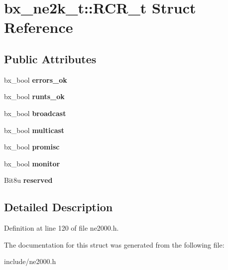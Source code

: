 \hypertarget{structbx__ne2k__t_1_1RCR__t}{\section{bx\-\_\-ne2k\-\_\-t\-:\-:R\-C\-R\-\_\-t Struct Reference}
\label{structbx__ne2k__t_1_1RCR__t}
}
\subsection*{Public Attributes}
\begin{DoxyCompactItemize}
\item 
\hypertarget{structbx__ne2k__t_1_1RCR__t_ae68499bda74dc5304345d81e47138eb1}{bx\-\_\-bool {\bfseries errors\-\_\-ok}}\label{structbx__ne2k__t_1_1RCR__t_ae68499bda74dc5304345d81e47138eb1}

\item 
\hypertarget{structbx__ne2k__t_1_1RCR__t_aa1c91619f3ddc9999a23e1f09dfd2d14}{bx\-\_\-bool {\bfseries runts\-\_\-ok}}\label{structbx__ne2k__t_1_1RCR__t_aa1c91619f3ddc9999a23e1f09dfd2d14}

\item 
\hypertarget{structbx__ne2k__t_1_1RCR__t_a1d2c2f4fde63f64c7d0b4bf5e3e6d0cc}{bx\-\_\-bool {\bfseries broadcast}}\label{structbx__ne2k__t_1_1RCR__t_a1d2c2f4fde63f64c7d0b4bf5e3e6d0cc}

\item 
\hypertarget{structbx__ne2k__t_1_1RCR__t_ab248e123cb2450c9474793c2ef89bca8}{bx\-\_\-bool {\bfseries multicast}}\label{structbx__ne2k__t_1_1RCR__t_ab248e123cb2450c9474793c2ef89bca8}

\item 
\hypertarget{structbx__ne2k__t_1_1RCR__t_a7c2ad9c644e7d98b26c1281b497bfd7e}{bx\-\_\-bool {\bfseries promisc}}\label{structbx__ne2k__t_1_1RCR__t_a7c2ad9c644e7d98b26c1281b497bfd7e}

\item 
\hypertarget{structbx__ne2k__t_1_1RCR__t_a4faa7664ee89c082cb66cb1a093eb726}{bx\-\_\-bool {\bfseries monitor}}\label{structbx__ne2k__t_1_1RCR__t_a4faa7664ee89c082cb66cb1a093eb726}

\item 
\hypertarget{structbx__ne2k__t_1_1RCR__t_af0ab6eb47360accf47dbf690c90e76bc}{Bit8u {\bfseries reserved}}\label{structbx__ne2k__t_1_1RCR__t_af0ab6eb47360accf47dbf690c90e76bc}

\end{DoxyCompactItemize}


\subsection{Detailed Description}


Definition at line 120 of file ne2000.\-h.



The documentation for this struct was generated from the following file\-:\begin{DoxyCompactItemize}
\item 
include/ne2000.\-h\end{DoxyCompactItemize}
